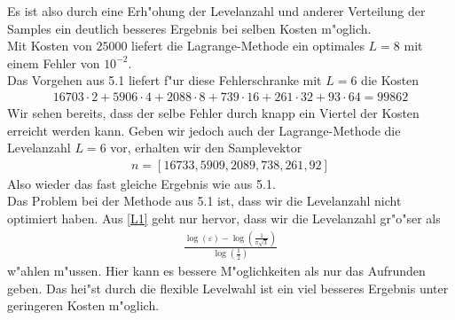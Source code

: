 Es ist also durch eine Erh"ohung der Levelanzahl und anderer Verteilung der Samples ein deutlich besseres Ergebnis bei selben Kosten m"oglich.\\
Mit Kosten von $25 000$ liefert die Lagrange-Methode ein optimales $L=8$ mit einem Fehler von $10^{-2}$.\\
Das Vorgehen aus 5.1 liefert f"ur diese Fehlerschranke mit $L=6$ die Kosten
\begin{align*}
16703\cdot 2+ 5906 \cdot 4+ 2088 \cdot 8+ 739 \cdot 16 + 261 \cdot 32 + 93 \cdot 64 =99862
\end{align*}
Wir sehen bereits, dass der selbe Fehler durch knapp ein Viertel der Kosten erreicht werden kann.
Geben wir jedoch auch der Lagrange-Methode die Levelanzahl $L=6$ vor, erhalten wir den Samplevektor
\begin{align*}
n=[16733,5909, 2089,738,261,92]
\end{align*}
Also wieder das fast gleiche Ergebnis wie aus 5.1.\\
Das Problem bei der Methode aus 5.1 ist, dass wir die Levelanzahl nicht optimiert haben. 
Aus \eqref{L1} geht nur hervor, dass wir die Levelanzahl gr"o"ser als 
\begin{align*}
\frac{\log(\varepsilon)-\log(\frac{1}{\pi\sqrt{3}})}{\log(\frac{1}{2})}
\end{align*} w"ahlen m"ussen. Hier kann es bessere M"oglichkeiten als nur das Aufrunden geben. Das hei"st durch die flexible Levelwahl ist ein viel besseres Ergebnis unter geringeren Kosten m"oglich.
 
